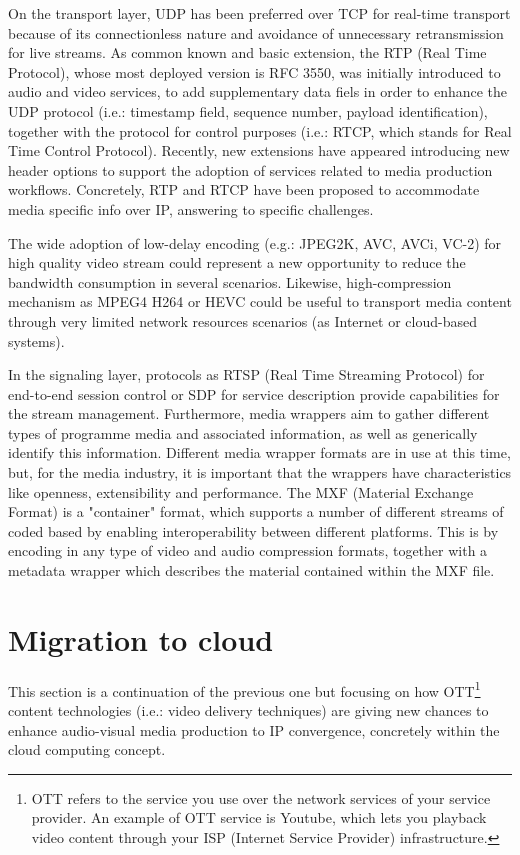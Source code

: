 On the transport layer, UDP has been preferred over TCP for real-time transport because of its connectionless nature and avoidance of unnecessary retransmission for live streams. As common known and basic extension, the RTP (Real Time Protocol), whose most deployed version is RFC 3550, was initially introduced to audio and video services, to add supplementary data fiels in order to enhance the UDP protocol (i.e.: timestamp field, sequence number, payload identification), together with the protocol for control purposes (i.e.: RTCP, which stands for Real Time Control Protocol). Recently, new extensions have appeared introducing new header options to support the adoption of services related to media production workflows. Concretely, RTP and RTCP have been proposed to accommodate media specific info over IP, answering to specific challenges.

The wide adoption of low-delay encoding (e.g.: JPEG2K, AVC, AVCi, VC-2) for high quality video stream could represent a new opportunity to reduce the bandwidth consumption in several scenarios. Likewise, high-compression mechanism as MPEG4 H264 or HEVC could be useful to transport media content through very limited network resources scenarios (as Internet or cloud-based systems).

In the signaling layer, protocols as RTSP (Real Time Streaming Protocol) for end-to-end session control or SDP for service description provide capabilities for the stream management. Furthermore, media wrappers aim to gather different types of programme media and associated information, as well as generically identify this information. Different media wrapper formats are in use at this time, but, for the media industry, it is important that the wrappers have characteristics like openness, extensibility and performance. The MXF (Material Exchange Format) is a "container" format, which supports a number of different streams of coded based by enabling interoperability between different platforms. This is by encoding in any type of video and audio compression formats, together with a metadata wrapper which describes the material contained within the MXF file. 

\section{Migration to cloud}

This section is a continuation of the previous one but focusing on how OTT\footnote{OTT refers to the service you use over the network services of your service provider. An example of OTT service is Youtube, which lets you playback video content through your ISP (Internet Service Provider) infrastructure.} \cite{ottVSiptv} content technologies (i.e.: video delivery techniques) are giving new chances to enhance audio-visual media production to IP convergence, concretely within the cloud computing concept. 

